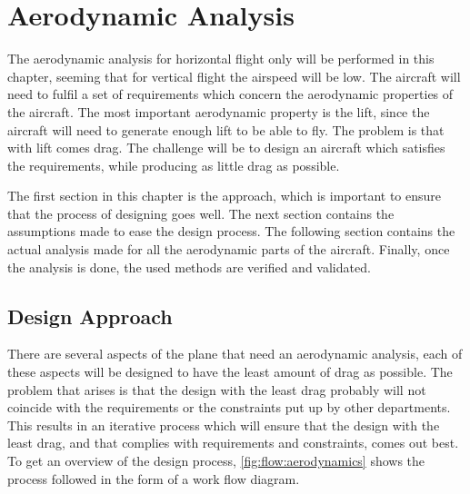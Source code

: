 \chapter{Aerodynamic Analysis}
\setlength{\parindent}{15pt}
\label{ch:aero_anal}

The aerodynamic analysis for horizontal flight only will be performed in this chapter, seeming that for vertical flight the airspeed will be low. The aircraft will need to fulfil a set of requirements which concern the aerodynamic properties of the aircraft. The most important aerodynamic property is the lift, since the aircraft will need to generate enough lift to be able to fly. The problem is that with lift comes drag. The challenge will be to design an aircraft which satisfies the requirements, while producing as little drag as possible.

The first section in this chapter is the approach, which is important to ensure that the process of designing goes well. The next section contains the assumptions made to ease the design process. The following section contains the actual analysis made for all the aerodynamic parts of the aircraft. Finally, once the analysis is done, the used methods are verified and validated. 

\section{Design Approach}

There are several aspects of the plane that need an aerodynamic analysis, each of these aspects will be designed to have the least amount of drag as possible. The problem that arises is that the design with the least drag probably will not coincide with the requirements or the constraints put up by other departments. This results in an iterative process which will ensure that the design with the least drag, and that complies with requirements and constraints, comes out best. To get an overview of the design process, \autoref{fig:flow:aerodynamics} shows the process followed in the form of a work flow diagram.

